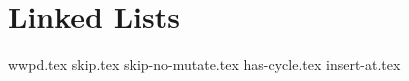 \documentclass{exam}
\begin{document}
\section{Linked Lists}
\begin{questions}
	{wwpd.tex}
	{skip.tex}
	{skip-no-mutate.tex}
	{has-cycle.tex}
	{insert-at.tex}
\end{questions}
\end{document}
